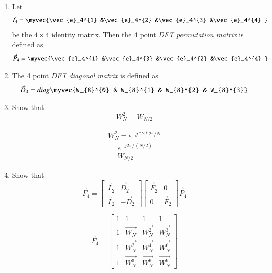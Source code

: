 \documentclass[journal,12pt,twocolumn]{IEEEtran}
\renewcommand\thesection{\arabic{section}}
\begin{document}
\begin{enumerate}[label=\arabic*.,ref=\thesection.\theenumi]
\item Let 
	\begin{align}
		\vec{I}_4 = \myvec{\vec{e}_4^{1} &\vec{e}_4^{2} &\vec{e}_4^{3} &\vec{e}_4^{4} }
	\end{align}
		be the $4\times 4$ identity matrix.  Then the 4 point {\em DFT permutation matrix} is defined as 
	\begin{align}
		\vec{P}_4 = \myvec{\vec{e}_4^{1} &\vec{e}_4^{3} &\vec{e}_4^{2} &\vec{e}_4^{4} }
	\end{align}
\item The 4 point {\em DFT diagonal matrix} is defined as 
	\begin{align}
		\vec{D}_4 = diag\myvec{W_{8}^{0} & W_{8}^{1} & W_{8}^{2} & W_{8}^{3}}
	\end{align}
\item Show that 
\begin{equation}
    W_{N}^{2}=W_{N/2}
\end{equation}
\begin{solution}
	\begin{align}
		W_{N}^{2} = {e}^{-j*2*2\pi/N}
		\\
		= {e}^{-j2\pi/(N/2)}
		\\
		= W_{N/2}
	\end{align}
\end{solution}
    \item Show that 
\begin{equation}
	\vec{F}_{4}=
\begin{bmatrix}
	\vec{I}_{2} & \vec{D}_{2} \\
\vec{I}_{2} & -\vec{D}_{2}
\end{bmatrix}
\begin{bmatrix}
\vec{F}_{2} & 0 \\
0 & \vec{F}_{2}
\end{bmatrix}
\vec{P}_{4}
\end{equation}
\begin{solution}
	\begin{equation}
	\vec{F}_{4}=
	\begin{bmatrix}
		1 & 1 & 1 & 1 \\
		1 & \vec{W_{N}} & \vec{W_{N}^{2}} & \vec{W_{N}^{3}}\\
		1 & \vec{W_{N}^{2}} & \vec{W_{N}^{4}} & \vec{W_{N}^{6}}\\
		1 & \vec{W_{N}^{3}} & \vec{W_{N}^{6}} & \vec{W_{N}^{9}}

\end{bmatrix}
\end{equation}
\end{solution}
\end{enumerate}
\end{document}
